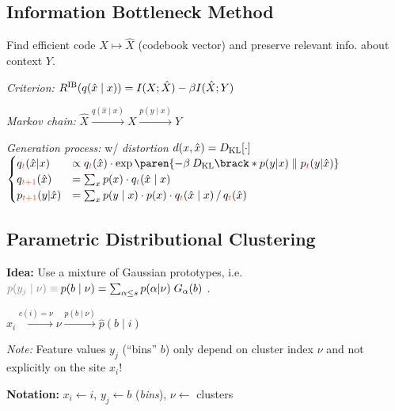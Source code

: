 \subsection{Information Bottleneck Method}

Find efficient code $X \mapsto \hat X$ (codebook vector) and preserve relevant info. about context $Y$.

\emph{Criterion:}\enskip
$R^\mathrm{IB}(q(\hat x\mid x)) = I(X; \hat X) - \beta I(\hat X; Y)$

\emph{Markov chain:}\enskip
$\hat X \xrightarrow{q(\hat x\mid x)} X \xrightarrow{p(y\mid x)} Y$

\emph{Generation process:}\enskip
w/ \textit{distortion} $d(x,\hat x) = D_\mathrm{KL}[\cdot]$\\
$\begin{cases}\begin{matrix*}[l]
    q_{\color{OrangeRed} t}(\hat x\vert x) &
        \propto q_{\color{OrangeRed} t}(\hat x) \cdot \exp\paren{ -\beta \: D\ped{KL}\brack*{p(y\vert x) \parallel p_{\color{red} t}(y\vert \hat x)} }
    \\
    q_{\color{OrangeRed} t{+}1}(\hat x) &
        = \sum_x p(x) \cdot q_{\color{OrangeRed} t}(\hat x \mid x)
    \\
    p_{\color{OrangeRed} t{+}1}(y\vert \hat x) &
        = \sum_{x} p(y\mid x) \cdot p(x) \cdot q_{\color{OrangeRed} t}(\hat x\mid x) \,/\, q_{\color{OrangeRed} t}(\hat x)
\end{matrix*}\end{cases}$

\subsection{Parametric Distributional Clustering}

\textbf{Idea:} Use a mixture of Gaussian prototypes, i.e.\\  $\textcolor{gray}{p(y_j\mid\nu)\equiv\:} p(b\mid\nu) = \sum_{\alpha\leq s} p(\alpha\vert\nu) \; G_\alpha(b)$ .

\begin{minipage}{\linewidth}
    \centering
    $x_i \xrightarrow{c(i) = \nu} \nu \xrightarrow{p(b\mid\nu)} \hat p(b\mid i)$
\end{minipage}

\textit{Note:}\enspace
Feature values $y_j$ (``bins'' $b$) only depend on cluster index $\nu$ and not explicitly on the site $x_i$!

\textbf{Notation:}\enspace
$x_i \leftarrow i$, \enskip
$y_j \leftarrow b$ (\textit{bins}), \enskip
$\nu \leftarrow$ clusters

